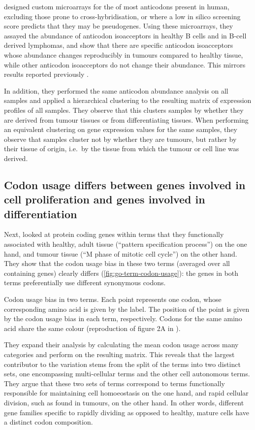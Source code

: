\citet{Gingold:2014} designed custom microarrays for the \trna[s] of most
anticodons present in human, excluding those prone to cross-hybridi\-sation, or
where a low in silico screening score predicts that they may be pseudogenes.
Using these microarrays, they assayed the abundance of anticodon isoacceptors in
healthy B cells and in B-cell derived lymphomas, and show that there are
specific anticodon isoacceptors whose abundance changes reproducibly in tumours
compared to healthy tissue, while other anticodon isoacceptors do not change
their abundance. This mirrors results reported previously
\citep{Pavon-Eternod:2009}.

In addition, they performed the same \trna anticodon abundance analysis on all
samples and applied a hierarchical clustering to the resulting matrix of \trna
expression profiles of all samples. They observe that this clusters samples by
whether they are derived from tumour tissues or from differentiating tissues.
When performing an equivalent clustering on \mrna gene expression values for the
same samples, they observe that samples cluster not by whether they are tumours,
but rather by their tissue of origin, i.e.\ by the tissue from which the tumour
or cell line was derived.

\subsection{Codon usage differs between genes involved in cell proliferation and
genes involved in differentiation}

Next, \citet{Gingold:2014} looked at protein coding genes within \go terms that
they functionally associated with healthy, adult tissue (“pattern specification
process”) on the one hand, and tumour tissue (“M phase of mitotic cell cycle”)
on the other hand. They show that the codon usage bias in these two \go terms
(averaged over all containing genes) clearly differs
(\cref{fig:go-term-codon-usage}): the genes in both \go terms preferentially use
different synonymous codons.

    {Codon usage bias in two  terms.}
    {Each point represents one codon, whose corresponding amino acid is given by
    the label. The position of the point is given by the codon usage bias in
    each \go term, respectively. Codons for the same amino acid share the same
    colour (reproduction of figure 2A in \citet{Gingold:2014}).}

They expand their analysis by calculating the mean codon usage across many \go
categories and perform \pca on the resulting matrix. This reveals that the
largest contributor to the variation stems from the split of the \go terms into
two distinct sets, one encompassing multi-cellular \go terms and the other cell
autonomous \go terms. They argue that these two sets of \go terms correspond to
\go terms functionally responsible for maintaining cell homoeostasis on the one
hand, and rapid cellular division, such as found in tumours, on the other hand.
In other words, different gene families specific to rapidly dividing as opposed
to healthy, mature cells have a distinct codon composition.

